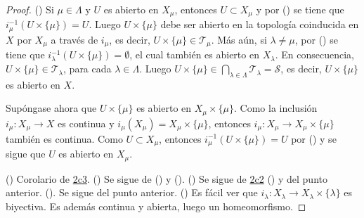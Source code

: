 \begin{proof}
({\scshape{}}) Si $\mu \in \Lambda$ y $U$ es abierto en $X_{\mu}$, entonces $U \subset X_{\mu}$ y por ({\scshape{}}) se tiene que $i^{-1}_{\mu}(U \times \{ \mu \}) = U$. Luego $U \times \{ \mu \}$ debe ser abierto en la topología coinducida en $X$ por $X_{\mu}$ a través de $i_{\mu}$, es decir, $U \times \{ \mu \} \in \mathcal{T}_{\mu}$. Más aún, si $\lambda \ne \mu$, por ({\scshape{}}) se tiene que $i^{-1}_{\lambda}(U \times \{ \mu \}) = \emptyset$, el cual también es abierto en $X_{\lambda}$. En consecuencia, $U \times \{ \mu \} \in \mathcal{T}_{\lambda}$, para cada $\lambda \in \Lambda$. Luego $U \times \{ \mu \} \in \bigcap_{\lambda \in \Lambda} \mathcal{T}_{\lambda} = \mathcal{S}$, es decir, $U \times \{ \mu \}$ es abierto en $X$.
\bigskip

Supóngase ahora que $U \times \{ \mu \}$ es abierto en $X_{\mu} \times \{ \mu \}$. Como la inclusión $i_{\mu} : X_{\mu} \longrightarrow X$ es continua y $i_{\mu}(X_{\mu}) = X_{\mu} \times \{ \mu \}$, entonces $i_{\mu} : X_{\mu} \longrightarrow X_{\mu} \times \{ \mu \}$ también es continua. Como $U \subset X_{\mu}$, entonces $i^{-1}_{\mu}(U \times \{ \mu \}) = U$ por ({\scshape{}}) y se sigue que $U$ es abierto en $X_{\mu}$.
\bigskip

({\scshape{}}) Corolario de \hyperref[card:2c3]{\textsf{2c3}}. ({\scshape{}}) Se sigue de ({\scshape{}}) y ({\scshape{}}). ({\scshape{}}) Se sigue de \hyperref[card:2c2]{\textsf{2c2}} ({\scshape{}}) y del punto anterior. ({\scshape{}}). Se sigue del punto anterior. ({\scshape{}}) Es fácil ver que $i_{\lambda} : X_{\lambda} \longrightarrow X_{\lambda} \times \{ \lambda \}$ es biyectiva. Es además continua y abierta, luego un homeomorfismo.

\end{proof}
